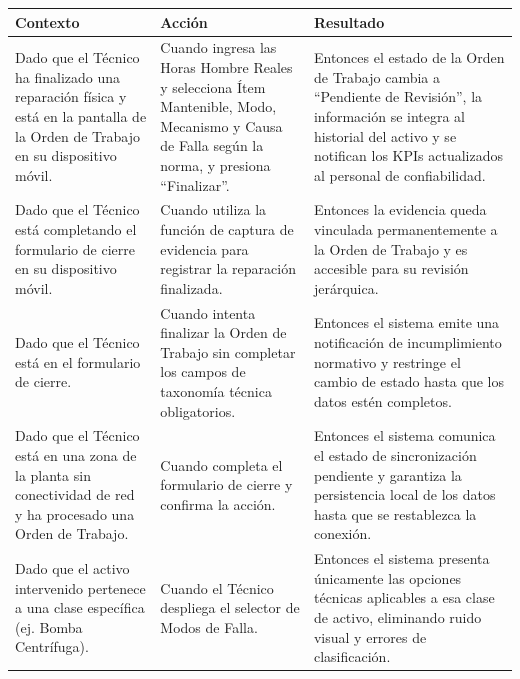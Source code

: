 \footnotesize\begin{longtable}{|p{0.28\textwidth}|p{0.32\textwidth}|p{0.34\textwidth}|}\hline
\textbf{Contexto} & \textbf{Acción} & \textbf{Resultado} \\ \hline
\parbox[t]{\linewidth}{Dado que el Técnico ha finalizado una reparación física y está en la pantalla de la Orden de Trabajo en su dispositivo móvil.} & \parbox[t]{\linewidth}{Cuando ingresa las Horas Hombre Reales y selecciona Ítem Mantenible, Modo, Mecanismo y Causa de Falla según la norma, y presiona ``Finalizar''.} & \parbox[t]{\linewidth}{Entonces el estado de la Orden de Trabajo cambia a ``Pendiente de Revisión'', la información se integra al historial del activo y se notifican los KPIs actualizados al personal de confiabilidad.} \\ \hline
\parbox[t]{\linewidth}{Dado que el Técnico está completando el formulario de cierre en su dispositivo móvil.} & \parbox[t]{\linewidth}{Cuando utiliza la función de captura de evidencia para registrar la reparación finalizada.} & \parbox[t]{\linewidth}{Entonces la evidencia queda vinculada permanentemente a la Orden de Trabajo y es accesible para su revisión jerárquica.} \\ \hline
\parbox[t]{\linewidth}{Dado que el Técnico está en el formulario de cierre.} & \parbox[t]{\linewidth}{Cuando intenta finalizar la Orden de Trabajo sin completar los campos de taxonomía técnica obligatorios.} & \parbox[t]{\linewidth}{Entonces el sistema emite una notificación de incumplimiento normativo y restringe el cambio de estado hasta que los datos estén completos.} \\ \hline
\parbox[t]{\linewidth}{Dado que el Técnico está en una zona de la planta sin conectividad de red y ha procesado una Orden de Trabajo.} & \parbox[t]{\linewidth}{Cuando completa el formulario de cierre y confirma la acción.} & \parbox[t]{\linewidth}{Entonces el sistema comunica el estado de sincronización pendiente y garantiza la persistencia local de los datos hasta que se restablezca la conexión.} \\ \hline
\parbox[t]{\linewidth}{Dado que el activo intervenido pertenece a una clase específica (ej. Bomba Centrífuga).} & \parbox[t]{\linewidth}{Cuando el Técnico despliega el selector de Modos de Falla.} & \parbox[t]{\linewidth}{Entonces el sistema presenta únicamente las opciones técnicas aplicables a esa clase de activo, eliminando ruido visual y errores de clasificación.} \\ \hline
\end{longtable}\normalsize

